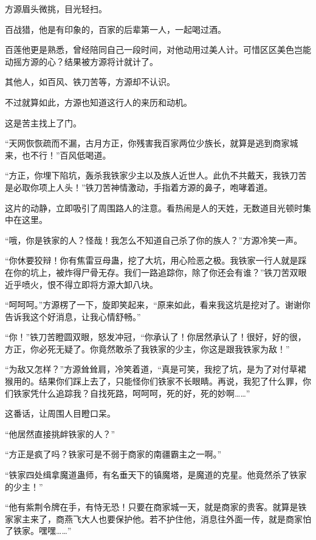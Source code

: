 
\begin{this_body}

方源眉头微挑，目光轻扫。

百战猎，他是有印象的，百家的后辈第一人，一起喝过酒。

百莲他更是熟悉，曾经陪同自己一段时间，对他动用过美人计。可惜区区美色岂能动摇方源的心？结果被方源将计就计了。

其他人，如百风、铁刀苦等，方源却不认识。

不过就算如此，方源也知道这行人的来历和动机。

这是苦主找上了门。

“天网恢恢疏而不漏，古月方正，你残害我百家两位少族长，就算是逃到商家城来，也不行！”百风低喝道。

“方正，你埋下陷坑，轰杀我铁家少主以及族人近世人。此仇不共戴天，我铁刀苦是必取你项上人头！”铁刀苦神情激动，手指着方源的鼻子，咆哮着道。

这片的动静，立即吸引了周围路人的注意。看热闹是人的天姓，无数道目光顿时集中在这里。

“哦，你是铁家的人？怪哉！我怎么不知道自己杀了你的族人？”方源冷笑一声。

“你休要狡辩！你有焦雷豆母蛊，挖了大坑，用心险恶之极。我铁家一行人就是踩在你的坑上，被炸得尸骨无存。我们一路追踪你，除了你还会有谁？”铁刀苦双眼近乎喷火，恨不得立即将方源大卸八块。

“呵呵呵。”方源楞了一下，旋即笑起来，“原来如此，看来我这坑是挖对了。谢谢你告诉我这个好消息，让我心情舒畅。”

“你！”铁刀苦瞪圆双眼，怒发冲冠，“你承认了！你居然承认了！很好，好的很，方正，你必死无疑了。你竟然敢杀了我铁家的少主，你这是跟我铁家为敌！”

“为敌又怎样？”方源耸耸肩，冷笑着道，“真是可笑，我挖了坑，是为了对付草裙猴用的。结果你们踩上去了，只能怪你们铁家不长眼睛。再说，我犯了什么罪，你们铁家凭什么追踪我？自找死路，呵呵呵，死的好，死的妙啊……”

这番话，让周围人目瞪口呆。

“他居然直接挑衅铁家的人？”

“方正是疯了吗？铁家可是不弱于商家的南疆霸主之一啊。”

“铁家四处缉拿魔道蛊师，有名垂天下的镇魔塔，是魔道的克星。他竟然杀了铁家的少主！”

“他有紫荆令牌在手，有恃无恐！只要在商家城一天，就是商家的贵客。就算是铁家家主来了，商燕飞大人也要保护他。若不护住他，消息往外面一传，就是商家怕了铁家。嘿嘿……”


\end{this_body}

